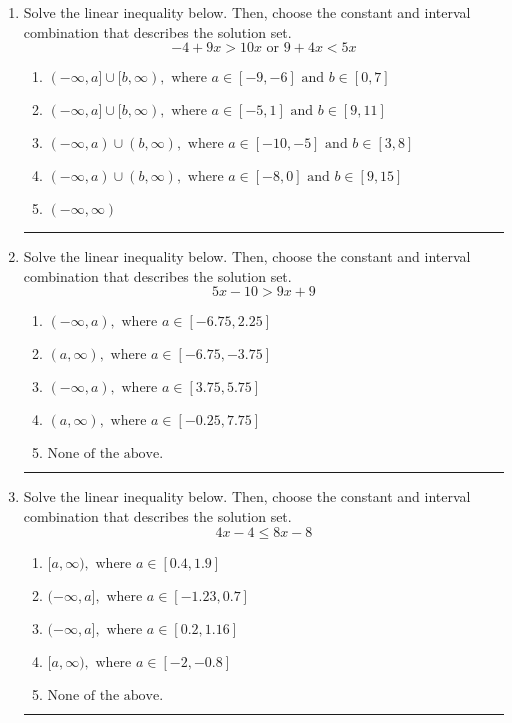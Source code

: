 \documentclass[14pt]{extbook}
\newcommand{\litem}[1]{\item#1\hspace*{-1cm}\rule{\textwidth}{0.4pt}}
\begin{document}
\begin{enumerate}
\litem{
Solve the linear inequality below. Then, choose the constant and interval combination that describes the solution set.\[ -4 + 9 x > 10 x \text{ or } 9 + 4 x < 5 x \]\begin{enumerate}[label=\Alph*.]
\item \( (-\infty, a] \cup [b, \infty), \text{ where } a \in [-9, -6] \text{ and } b \in [0, 7] \)
\item \( (-\infty, a] \cup [b, \infty), \text{ where } a \in [-5, 1] \text{ and } b \in [9, 11] \)
\item \( (-\infty, a) \cup (b, \infty), \text{ where } a \in [-10, -5] \text{ and } b \in [3, 8] \)
\item \( (-\infty, a) \cup (b, \infty), \text{ where } a \in [-8, 0] \text{ and } b \in [9, 15] \)
\item \( (-\infty, \infty) \)

\end{enumerate} }
\litem{
Solve the linear inequality below. Then, choose the constant and interval combination that describes the solution set.\[ 5x -10 > 9x + 9 \]\begin{enumerate}[label=\Alph*.]
\item \( (-\infty, a), \text{ where } a \in [-6.75, 2.25] \)
\item \( (a, \infty), \text{ where } a \in [-6.75, -3.75] \)
\item \( (-\infty, a), \text{ where } a \in [3.75, 5.75] \)
\item \( (a, \infty), \text{ where } a \in [-0.25, 7.75] \)
\item \( \text{None of the above}. \)

\end{enumerate} }
\litem{
Solve the linear inequality below. Then, choose the constant and interval combination that describes the solution set.\[ 4x -4 \leq 8x -8 \]\begin{enumerate}[label=\Alph*.]
\item \( [a, \infty), \text{ where } a \in [0.4, 1.9] \)
\item \( (-\infty, a], \text{ where } a \in [-1.23, 0.7] \)
\item \( (-\infty, a], \text{ where } a \in [0.2, 1.16] \)
\item \( [a, \infty), \text{ where } a \in [-2, -0.8] \)
\item \( \text{None of the above}. \)


\end{enumerate}}
\end{enumerate}
\end{document}
